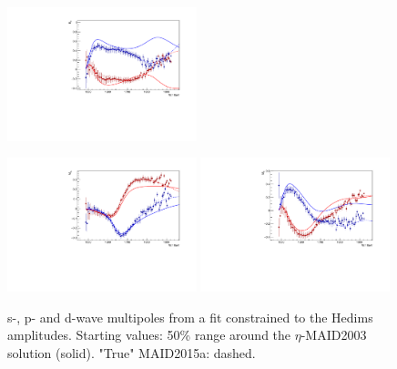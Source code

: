 \documentclass[a4paper,12pt]{report}
\begin{document}
\begin{figure}
\begin{center}
{    \includegraphics[width=0.49\textwidth]{MAID/Hedim/plots.0/E2m.pdf}
    }
    \centerline{
    \includegraphics[width=0.49\textwidth]{MAID/Hedim/plots.0/M2p.pdf}
    \includegraphics[width=0.49\textwidth]{MAID/Hedim/plots.0/M2m.pdf}
    }
    \caption{s-, p- and d-wave multipoles from a fit constrained to the Hedims amplitudes. 
    Starting values: 50\% range around the $\eta$-MAID2003 solution (solid). "True" MAID2015a: dashed.}
\label{Fig:const6}
  \end{center}
\end{figure}
\end{document}
